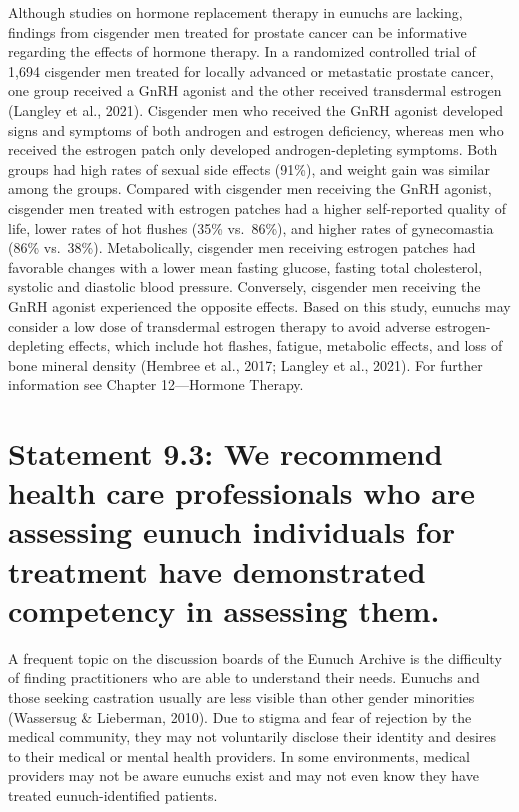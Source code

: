 \documentclass[
]{book}
\begin{document}
Although studies on hormone replacement
therapy in eunuchs are lacking, findings from
cisgender men treated for prostate cancer can be
informative regarding the effects of hormone
therapy. In a randomized controlled trial of 1,694
cisgender men treated for locally advanced or
metastatic prostate cancer, one group received a
GnRH agonist and the other received transdermal
estrogen (Langley et al., 2021). Cisgender men
who received the GnRH agonist developed signs
and symptoms of both androgen and estrogen
deficiency, whereas men who received the estrogen patch only developed androgen-depleting
symptoms. Both groups had high rates of sexual
side effects (91\%), and weight gain was similar
among the groups. Compared with cisgender men
receiving the GnRH agonist, cisgender men
treated with estrogen patches had a higher
self-reported quality of life, lower rates of hot
flushes (35\% vs.~86\%), and higher rates of gynecomastia (86\% vs.~38\%). Metabolically, cisgender
men receiving estrogen patches had favorable
changes with a lower mean fasting glucose, fasting total cholesterol, systolic and diastolic blood
pressure. Conversely, cisgender men receiving the
GnRH agonist experienced the opposite effects.
Based on this study, eunuchs may consider a low
dose of transdermal estrogen therapy to avoid
adverse estrogen-depleting effects, which include
hot flashes, fatigue, metabolic effects, and loss of
bone mineral density (Hembree et al., 2017;
Langley et al., 2021). For further information see
Chapter 12---Hormone Therapy.

\hypertarget{statement-9.3-we-recommend-health-care-professionals-who-are-assessing-eunuch-individuals-for-treatment-have-demonstrated-competency-in-assessing-them.}{%
\section*{Statement 9.3: We recommend health care professionals who are assessing eunuch individuals for treatment have demonstrated competency in assessing them.}\label{statement-9.3-we-recommend-health-care-professionals-who-are-assessing-eunuch-individuals-for-treatment-have-demonstrated-competency-in-assessing-them.}}

A frequent topic on the discussion boards of
the Eunuch Archive is the difficulty of finding
practitioners who are able to understand their
needs. Eunuchs and those seeking castration usually are less visible than other gender minorities
(Wassersug \& Lieberman, 2010). Due to stigma
and fear of rejection by the medical community,
they may not voluntarily disclose their identity
and desires to their medical or mental health
providers. In some environments, medical providers may not be aware eunuchs exist and may
not even know they have treated eunuch-identified
patients.
\end{document}
